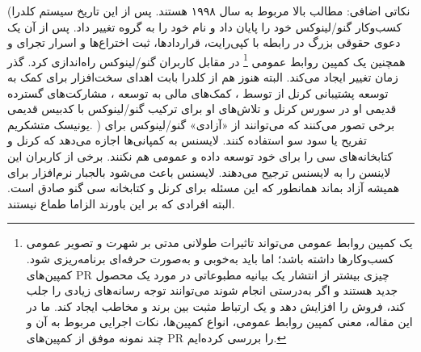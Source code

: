 (نکاتی اضافی: مطالب بالا مربوط به سال ۱۹۹۸ هستند. پس از این تاریخ سیستم کلدرا کسب‌وکار گنو/لینوکس
خود را پایان داد و نام خود را به گروه  تغییر داد. پس از آن یک دعوی حقوقی بزرگ در رابطه با
کپی‌رایت، قراردادها، ثبت اختراع‌ها و اسرار تجرای و همچنین یک کمپین روابط عمومی
\footnote{
یک کمپین روابط عمومی می‌تواند تاثیرات طولانی مدتی بر شهرت و تصویر عمومی کسب‌وکارها داشته باشد؛
اما باید به‌خوبی و به‌صورت حرفه‌ای برنامه‌ریزی شود. کمپین‌های PR چیزی بیشتر از انتشار یک بیانیه مطبوعاتی
در مورد یک محصول جدید هستند و اگر به‌درستی انجام شوند می‌توانند توجه رسانه‌های زیادی را جلب کند،
فروش را افزایش دهد و یک ارتباط مثبت بین برند و مخاطب ایجاد کند. ما در این مقاله، معنی کمپین روابط عمومی،
انواع کمپین‌ها، نکات اجرایی مربوط به آن و چند نمونه موفق از کمپین‌های PR را بررسی کرده‌ایم.
}
در مقابل کاربران گنو/لینوکس راه‌اندازی کرد. گذر زمان تغییر ایجاد می‌کند.
البته هنوز هم از کلدرا بابت اهدای سخت‌افزار برای کمک به توسعه پشتیبانی کرنل از  توسط
،
کمک‌های مالی به توسعه  ، مشارکت‌های گسترده قدیمی او در سورس کرنل و تلاش‌های او
برای ترکیب گنو/لینوکس با کدبیس قدیمی یونیسک متشکریم.
)
برخی تصور می‌کنند که می‌توانند از «آزادی» گنو/لینوکس برای تفریح یا سود سو استفاده کنند.
لایسنس  به کمپانی‌ها اجازه می‌دهد که کرنل و کتابخانه‌های سی را برای خود توسعه
داده و عمومی هم نکنند. برخی از کاربران این لاینسن را به لایسنس  ترجیح می‌دهند.
لایسنس  باعث می‌شود بالجبار نرم‌افزار برای همیشه آزاد بماند همانطور که این مسئله
برای کرنل و کتابخانه سی گنو صادق است. البته افرادی که بر این باورند الزاما طماع نیستند.



